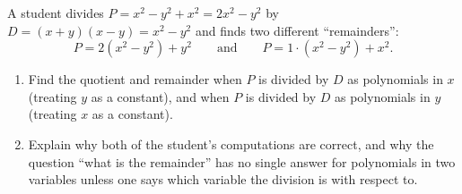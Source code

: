 A student divides $P=x^2-y^2+x^2=2x^2-y^2$ by $D=(x+y)(x-y)=x^2-y^2$ and finds two different ``remainders'':
\[
P=2(x^2-y^2)+y^2\qquad\text{and}\qquad P=1\cdot(x^2-y^2)+x^2 .
\]
\begin{enumerate}
\item[(a)] Find the quotient and remainder when $P$ is divided by $D$ as polynomials in $x$ (treating $y$ as a constant), and when $P$ is divided by $D$ as polynomials in $y$ (treating $x$ as a constant).
\item[(b)] Explain why both of the student's computations are correct, and why the question ``what is the remainder'' has no single answer for polynomials in two variables unless one says which variable the division is with respect to.
\end{enumerate}
